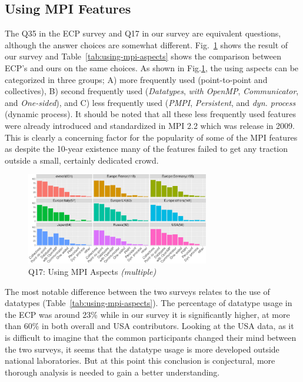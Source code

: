 \documentclass[preprint,5p,times]{elsarticle}
\def\myquote#1{{\it #1}}
\begin{document}
\subsection{Using MPI Features}\label{sec:mpi-aspects}

The Q35 in the ECP survey and Q17 in our survey are equivalent
questions, although the answer choices are somewhat
different. Fig.~\ref{fig:using-mpi-aspects} shows the result of our
survey and Table~\ref{tab:using-mpi-aspects} shows the comparison
between ECP's and ours on the same choices. As shown in
Fig.\ref{fig:using-mpi-aspects}, the
using aspects can be categorized in three groups; A) more frequently
used (point-to-point and collectives), B) second frequently used
(\myquote{Datatypes}, \myquote{with OpenMP}, \myquote{Communicator}, and \myquote{One-sided}), and C) less
frequently used (\myquote{PMPI}, \myquote{Persistent}, and
\myquote{dyn. process} (dynamic process).
%
It should be noted that all these less frequently used features were already
introduced and standardized in MPI 2.2 which was release in 2009. This is
clearly a concerning factor for the popularity of some of the MPI features as
despite the 10-year existence many of the features failed to get any traction
outside a small, certainly dedicated crowd.

\begin{figure}[htb]
  \begin{center}
    \includegraphics[width=8.0cm]{R-scripts/Q17.pdf}
    \vspace{-2mm}
    \caption{Q17: Using MPI Aspects {\it(multiple)}}
    \label{fig:using-mpi-aspects}
  \end{center}
\end{figure}

The most notable difference between the two surveys relates to the use of
datatypes (Table~\ref{tab:using-mpi-aspects}). The percentage of datatype usage
in the ECP was around 23\% while in our survey it is significantly higher, at
more than 60\% in both overall and USA contributors.
%
Looking at the USA data, as it is difficult to imagine that the common
participants changed their mind between the two surveys, it seems that the
datatype usage is more developed outside national laboratories. But at this
point this conclusion is conjectural, more thorough analysis is needed to gain a
better understanding.
\end{document}
